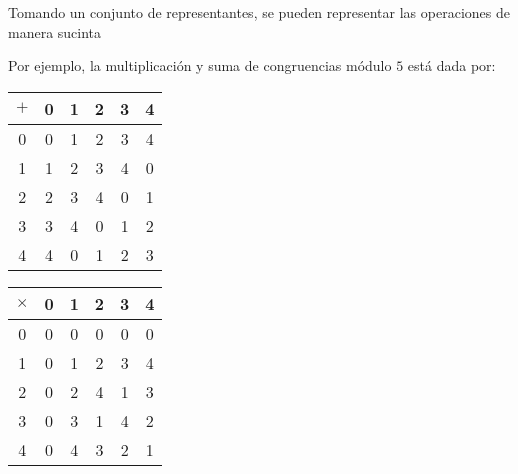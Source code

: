 Tomando un conjunto de representantes, se pueden representar las operaciones de manera sucinta 

Por ejemplo, la multiplicación y suma de congruencias módulo $5$ está dada por:

\begin{center}
\begin{tabular}{|c||c|c|c|c|c|} 
 \hline
  $\plus$ & 0 & 1 & 2 & 3 & 4 \\ 
  \hline
  \hline
  0 & 0 & 1 & 2 & 3 & 4 \\ 
  \hline
  1 & 1 & 2 & 3 & 4 & 0 \\ 
  \hline
  2 & 2 & 3 & 4 & 0 & 1 \\ 
  \hline
  3 & 3 & 4 & 0 & 1 & 2 \\ 
  \hline
  4 & 4 & 0 & 1 & 2 & 3 \\ 
  \hline  
  \end{tabular}
  \hspace{2cm}
  \begin{tabular}{|c||c|c|c|c|c|} 
 \hline
  $\times$ & 0 & 1 & 2 & 3 & 4 \\ 
  \hline
  \hline
  0 & 0 & 0 & 0 & 0 & 0 \\ 
  \hline
  1 & 0 & 1 & 2 & 3 & 4 \\ 
  \hline
  2 & 0 & 2 & 4 & 1 & 3 \\ 
  \hline
  3 & 0 & 3 & 1 & 4 & 2 \\ 
  \hline
  4 & 0 & 4 & 3 & 2 & 1 \\ 
  \hline  
  \end{tabular}
  \end{center}
  

